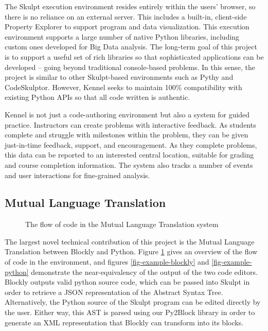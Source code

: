 \documentclass{sig-alternate}
\begin{document}
The Skulpt execution environment resides entirely within the users' browser, so there is no reliance on an external server. This includes a built-in, client-side Property Explorer to support program and data visualization. This execution environment supports a large number of native Python libraries, including custom ones developed for Big Data analysis. The long-term goal of this project is to support a useful set of rich libraries so that sophisticated applications can be developed -- going beyond traditional console-based problems. In this sense, the project is similar to other Skulpt-based environments such as Pythy and CodeSkulptor. However, Kennel seeks to maintain 100\% compatibility with existing Python APIs so that all code written is authentic.

Kennel is not just a code-authoring environment but also a system for guided practice. Instructors can create problems with interactive feedback. As students complete and struggle with milestones within the problem, they can be given just-in-time feedback, support, and encouragement. As they complete problems, this data can be reported to an interested central location, suitable for grading and course completion information. The system also tracks a number of events and user interactions for fine-grained analysis.

\subsection{Mutual Language Translation}

\begin{figure}
\label{fig-mlt-overview}
\caption{The flow of code in the Mutual Language Translation system}
\end{figure}

The largest novel technical contribution of this project is the Mutual Language Translation between Blockly and Python.
Figure \ref{fig-mlt-overview} gives an overview of the flow of code in the environment, and figures \ref{fig-example-blockly} and \ref{fig-example-python} demonstrate the near-equivalency of the output of the two code editors.
Blockly outputs valid python source code, which can be passed into Skulpt in order to retrieve a JSON representation of the Abstract Syntax Tree.
Alternatively, the Python source of the Skulpt program can be edited directly by the user. 
Either way, this AST is parsed using our Py2Block library in order to generate an XML representation that Blockly can transform into its blocks.
\end{document}
